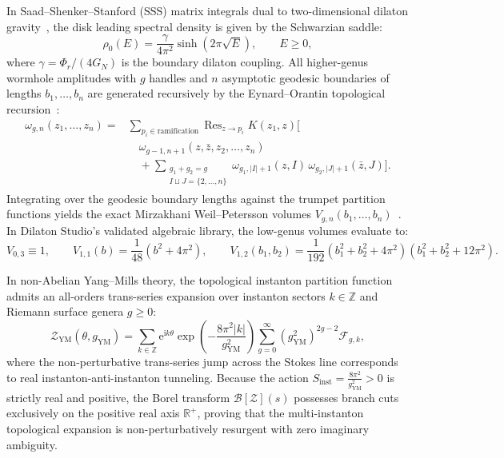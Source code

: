 \documentclass[11pt,a4paper,reqno]{article}
\theoremstyle{plain}
\theoremstyle{definition}
\theoremstyle{remark}
\numberwithin{equation}{section}
\begin{document}
In Saad--Shenker--Stanford (SSS) matrix integrals dual to two-dimensional dilaton gravity~\cite{SaadShenkerStanford2019, StanfordWitten2019}, the disk leading spectral density is given by the Schwarzian saddle:
\begin{equation}
  \rho_0(E) = \frac{\gamma}{4\pi^2} \sinh\left( 2\pi \sqrt{E} \right), \qquad E \ge 0,
  \label{eq:sss_disk_density}
\end{equation}
where $\gamma = \Phi_r / (4 G_N)$ is the boundary dilaton coupling. All higher-genus wormhole amplitudes with $g$ handles and $n$ asymptotic geodesic boundaries of lengths $b_1, \dots, b_n$ are generated recursively by the Eynard--Orantin topological recursion~\cite{EynardOrantin2007}:
\begin{equation}
  \begin{aligned}
    \omega_{g,n}(z_1, \dots, z_n)
      = {} & \sum_{p_i \in \text{ramification}}
        \operatorname{Res}_{z \to p_i} K(z_1, z) \Biggl[ \\
      & \quad \omega_{g-1, n+1}(z, \bar{z}, z_2, \dots, z_n) \\
      & \quad + \sum_{\substack{g_1+g_2=g \\ I \sqcup J = \{2, \dots, n\}}}
        \omega_{g_1, |I|+1}(z, I) \,
        \omega_{g_2, |J|+1}(\bar{z}, J) \Biggr].
  \end{aligned}
\end{equation}
Integrating over the geodesic boundary lengths against the trumpet partition functions yields the exact Mirzakhani Weil--Petersson volumes $V_{g,n}(b_1, \dots, b_n)$~\cite{Mirzakhani2007}. In Dilaton Studio's validated algebraic library, the low-genus volumes evaluate to:
\begin{equation}
  V_{0,3} \equiv 1, \qquad V_{1,1}(b) = \frac{1}{48}\left( b^2 + 4\pi^2 \right), \qquad V_{1,2}(b_1, b_2) = \frac{1}{192}\left( b_1^2 + b_2^2 + 4\pi^2 \right)\left( b_1^2 + b_2^2 + 12\pi^2 \right).
\end{equation}

In non-Abelian Yang--Mills theory, the topological instanton partition function admits an all-orders trans-series expansion over instanton sectors $k \in \mathbb{Z}$ and Riemann surface genera $g \ge 0$:
\begin{equation}
  \mathcal{Z}_{\mathrm{YM}}(\theta, g_{\mathrm{YM}}) = \sum_{k \in \mathbb{Z}} \mathrm{e}^{\mathrm{i} k \theta} \exp\left( - \frac{8\pi^2 |k|}{g_{\mathrm{YM}}^2} \right) \sum_{g=0}^\infty \left( g_{\mathrm{YM}}^2 \right)^{2g - 2} \mathcal{F}_{g, k},
  \label{eq:ym_trans_series}
\end{equation}
where the non-perturbative trans-series jump across the Stokes line corresponds to real instanton-anti-instanton tunneling. Because the action $S_{\mathrm{inst}} = \frac{8\pi^2}{g_{\mathrm{YM}}^2} > 0$ is strictly real and positive, the Borel transform $\mathcal{B}[\mathcal{Z}](s)$ possesses branch cuts exclusively on the positive real axis $\mathbb{R}^+$, proving that the multi-instanton topological expansion is non-perturbatively resurgent with zero imaginary ambiguity.
\end{document}
